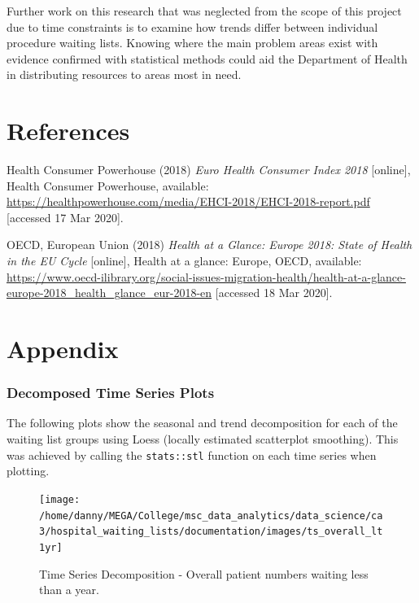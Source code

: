 \documentclass[
  12pt,
]{article}
\newlength{\cslhangindent}
\newenvironment{cslreferences}%
  {\setlength{\parindent}{0pt}%
  \everypar{\setlength{\hangindent}{\cslhangindent}}\ignorespaces}%
  {\par}
\begin{document}
Further work on this research that was neglected from the scope of this project due to time constraints is to examine how trends differ between individual procedure waiting lists. Knowing where the main problem areas exist with evidence confirmed with statistical methods could aid the Department of Health in distributing resources to areas most in need.

\hypertarget{references}{%
\section{References}\label{references}}

\hypertarget{refs}{}
\begin{cslreferences}
\leavevmode\hypertarget{ref-health_consumer_powerhouse_euro_2018}{}%
Health Consumer Powerhouse (2018) \emph{Euro Health Consumer Index 2018} {[}online{]}, Health Consumer Powerhouse, available: \url{https://healthpowerhouse.com/media/EHCI-2018/EHCI-2018-report.pdf} {[}accessed 17 Mar 2020{]}.

\leavevmode\hypertarget{ref-oecd_health_2018}{}%
OECD, European Union (2018) \emph{Health at a Glance: Europe 2018: State of Health in the EU Cycle} {[}online{]}, Health at a glance: Europe, OECD, available: \url{https://www.oecd-ilibrary.org/social-issues-migration-health/health-at-a-glance-europe-2018_health_glance_eur-2018-en} {[}accessed 18 Mar 2020{]}.
\end{cslreferences}

\newpage

\hypertarget{appendix}{%
\section{Appendix}\label{appendix}}

\label{sec:appendix}
\appendix

\hypertarget{decomposed-time-series-plots}{%
\subsubsection{Decomposed Time Series Plots}\label{decomposed-time-series-plots}}

The following plots show the seasonal and trend decomposition for each of the waiting list groups using Loess (locally estimated scatterplot smoothing). This was achieved by calling the \texttt{stats::stl} function on each time series when plotting.

\begin{figure}

{\centering \texttt{[image: /home/danny/MEGA/College/msc\_data\_analytics/data\_science/ca3/hospital\_waiting\_lists/documentation/images/ts\_overall\_lt1yr]} 

}

\caption{Time Series Decomposition - Overall patient numbers waiting less than a year.}\label{fig:ts-overall-lt1yr}
\end{figure}
\end{document}
